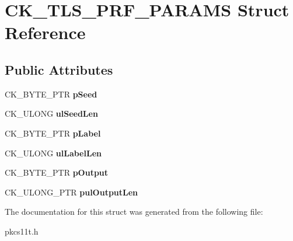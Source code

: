 \hypertarget{struct_c_k___t_l_s___p_r_f___p_a_r_a_m_s}{}\section{C\+K\+\_\+\+T\+L\+S\+\_\+\+P\+R\+F\+\_\+\+P\+A\+R\+A\+MS Struct Reference}
\label{struct_c_k___t_l_s___p_r_f___p_a_r_a_m_s}
\subsection*{Public Attributes}
\begin{DoxyCompactItemize}
\item 
\mbox{\label{struct_c_k___t_l_s___p_r_f___p_a_r_a_m_s_aa012b8b8d63420d7f362aea1fa01ab8e}} 
C\+K\+\_\+\+B\+Y\+T\+E\+\_\+\+P\+TR {\bfseries p\+Seed}
\item 
\mbox{\label{struct_c_k___t_l_s___p_r_f___p_a_r_a_m_s_aae15be52f15063f44a1aaa60dd342171}} 
C\+K\+\_\+\+U\+L\+O\+NG {\bfseries ul\+Seed\+Len}
\item 
\mbox{\label{struct_c_k___t_l_s___p_r_f___p_a_r_a_m_s_ad2cc7fd882acaa3a6bdb6154de8a111f}} 
C\+K\+\_\+\+B\+Y\+T\+E\+\_\+\+P\+TR {\bfseries p\+Label}
\item 
\mbox{\label{struct_c_k___t_l_s___p_r_f___p_a_r_a_m_s_ab34e2fdf546644631b1d029ba636c5cd}} 
C\+K\+\_\+\+U\+L\+O\+NG {\bfseries ul\+Label\+Len}
\item 
\mbox{\label{struct_c_k___t_l_s___p_r_f___p_a_r_a_m_s_a2149f3e8e3b28dc29ed3c7a1a3d9696c}} 
C\+K\+\_\+\+B\+Y\+T\+E\+\_\+\+P\+TR {\bfseries p\+Output}
\item 
\mbox{\label{struct_c_k___t_l_s___p_r_f___p_a_r_a_m_s_ac52ea2c9eac0b87c96eba125e814058b}} 
C\+K\+\_\+\+U\+L\+O\+N\+G\+\_\+\+P\+TR {\bfseries pul\+Output\+Len}
\end{DoxyCompactItemize}


The documentation for this struct was generated from the following file\+:\begin{DoxyCompactItemize}
\item 
pkcs11t.\+h\end{DoxyCompactItemize}
